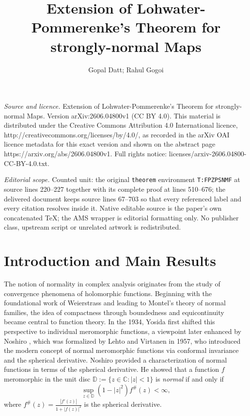 \documentclass[10pt,a4paper]{amsart}
\numberwithin{equation}{section}
\begin{document}
\title[Extension of Lohwater-Pommerenke's Theorem for strongly-norm]{Extension of Lohwater-Pommerenke's Theorem for strongly-normal Maps}
\author{Gopal Datt; Rahul Gogoi}
\date{}
\maketitle
\noindent\emph{Source and licence.} Extension of Lohwater-Pommerenke's Theorem for strongly-normal Maps. Version arXiv:2606.04800v1 (CC BY 4.0). This material is distributed under the Creative Commons Attribution 4.0 International licence, http://creativecommons.org/licenses/by/4.0/, as recorded in the arXiv OAI licence metadata for this exact version and shown on the abstract page https://arxiv.org/abs/2606.04800v1. Full rights notice: licenses/arxiv-2606.04800-CC-BY-4.0.txt.\par\smallskip
\noindent\textit{Editorial scope.} Counted unit: the original \texttt{theorem} environment \texttt{T:FPZPSNMF} at source lines 220--227 together with its complete proof at lines 510--676; the delivered document keeps source lines 67--703 so that every referenced label and every citation resolves inside it. Native editable source is the paper's own concatenated TeX; the AMS wrapper is editorial formatting only. No publisher class, upstream script or unrelated artwork is redistributed.
\section{Introduction and Main Results}

The notion of normality in complex analysis originates from the study of convergence phenomena of 
holomorphic functions. Beginning with the foundational work of Weierstrass and leading to 
Montel’s theory of normal families, the idea of compactness through boundedness and equicontinuity 
became central to function theory. In the 1934, Yosida \cite{yosida-oacomf-1934} first shifted this 
perspective to individual meromorphic functions, a viewpoint later enhanced by Noshiro \cite{noshiro-ctttomfituc-1938}, which was formalized by Lehto and 
Virtanen \cite{lehto-bbanmf-1957} in 1957, who introduced the modern concept of normal meromorphic functions via conformal invariance and the spherical 
derivative. Noshiro \cite{noshiro-ctttomfituc-1938} provided a characterization of normal functions in terms of the spherical derivative. He showed that a 
function $f$ meromorphic in the unit disc $\mathbb{D}:=\{z\in\mathbb C:|z|<1\}$ is \emph{normal} if and only if \begin{equation*}
\sup_{z\in\mathbb{D}}(1-|z|^2)f^\#(z)<\infty ,   
\end{equation*} where $\displaystyle f^\#(z)=\frac{|f'(z)|}{1+|f(z)|^2}$ is the spherical derivative.\\
\end{document}
